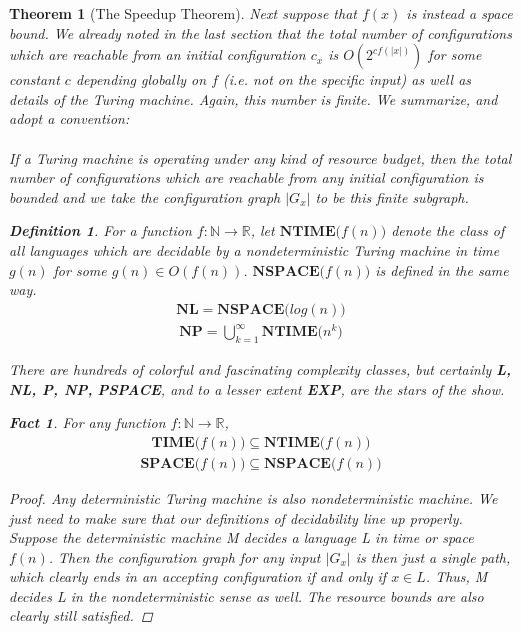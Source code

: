 \documentclass{article}
\theoremstyle{definition}
\newtheorem{definition}{Definition}[section]
\theoremstyle{plain}
\theoremstyle{theorem}
\newtheorem{fact}{Fact}[section]
\newtheorem{theorem}{Theorem}[section]
\begin{document}
\begin{theorem}[The Speedup Theorem]
\par Next suppose that $f(x)$ is instead a space bound. We already noted in the last section that the total number of configurations which are reachable from an initial configuration $c_x$ is $O(2^{cf(|x|)})$ for some constant $c$ depending globally on $f$ (i.e. not on the specific input) as well as details of the Turing machine. Again, this number is finite. We summarize, and adopt a convention: \\ \\
If a Turing machine is operating under any kind of resource budget, then the total number of configurations which are reachable from any initial configuration is bounded and we take the configuration graph $|G_x|$ to be this \textit{finite} subgraph.\\
\begin{definition}
For a function $f:\mathbb{N} \to \mathbb{R}$, let $\textbf{NTIME($f(n)$)}$ denote the class of all languages which are decidable by a nondeterministic Turing machine in time $g(n)$ for some $g(n) \in O(f(n))$.  $\textbf{NSPACE($f(n)$)}$ is defined in the same way.
\begin{align}
    \textbf{NL} = \textbf{NSPACE($log(n)$)}
\end{align}
\begin{align}
    \textbf{NP} = \bigcup_{k=1}^\infty \textbf{NTIME($n^k$)}
\end{align}
\end{definition}
There are hundreds of colorful and fascinating complexity classes, but certainly \textbf{L, NL, P, NP,} \textbf{PSPACE}, and to a lesser extent \textbf{EXP}, are the stars of the show. 
\begin{fact}
For any function $f:\mathbb{N} \to \mathbb{R}$,
\begin{align}
    \textbf{TIME($f(n)$)} \subseteq \textbf{NTIME($f(n)$)} 
\end{align}
\begin{align}
    \textbf{SPACE($f(n)$)} \subseteq \textbf{NSPACE($f(n)$)} 
\end{align}
\end{fact}
\begin{proof}
Any deterministic Turing machine is also nondeterministic machine. We just need to make sure that our definitions of decidability line up properly. Suppose the deterministic machine M decides a language L in time or space $f(n)$. Then the configuration graph for any input $|G_x|$ is then just a single path, which clearly ends in an accepting configuration if and only if $x \in L$. Thus, M decides L in the nondeterministic sense as well. The resource bounds are also clearly still satisfied.

\end{proof}
\end{theorem}
\end{document}
